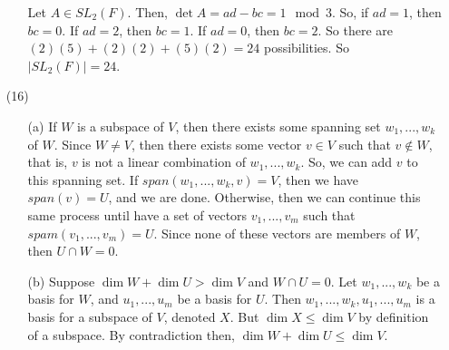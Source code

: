 \documentclass[12pt]{article}
\begin{document}
\begin{itemize}
\begin{itemize}
Let $A \in SL_2(F)$. Then, $\det A = ad - bc = 1 \mod 3$. So, if $ad = 1$, then $bc = 0$. If $ad = 2$, then $bc = 1$. If $ad = 0$, then $bc = 2$. So there are $(2)(5) + (2)(2) + (5)(2) = 24$ possibilities. So $|SL_2(F)| = 24$.
\end{itemize}
\item[(16)]
\begin{itemize}
\item[(a)]
If $W$ is a subspace of $V$, then there exists some spanning set $w_1, ..., w_k$ of $W$. Since $W \neq V$, then there exists some vector $v \in V$ such that $v \not \in W$, that is, $v$ is not a linear combination of $w_1, ..., w_k$. So, we can add $v$ to this spanning set. If $span(w_1, ..., w_k, v) = V$, then we have $span(v) = U$, and we are done. Otherwise, then we can continue this same process until have a set of vectors $v_1, ..., v_m$ such that $spam(v_1, ..., v_m) = U$. Since none of these vectors are members of $W$, then $U \cap W = 0$.
\item[(b)]
Suppose $\dim W + \dim U > \dim V$ and $W \cap U = 0$. Let $w_1, ..., w_k$ be a basis for $W$, and $u_1, ..., u_m$ be a basis for $U$. Then $w_1, ..., w_k, u_1, ..., u_m$ is a basis for a subspace of $V$, denoted $X$. But $\dim X \leq \dim V$ by definition of a subspace. By contradiction then, $\dim W + \dim U \leq \dim V$.
\end{itemize}
\end{itemize}
\end{document}
